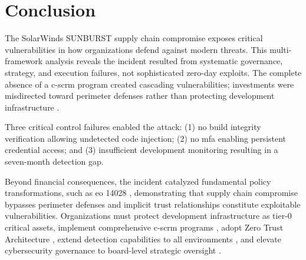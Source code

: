\section{Conclusion}
\label{sec:conclusion}

The SolarWinds SUNBURST supply chain compromise exposes critical vulnerabilities in how organizations defend against modern threats. This multi-framework analysis reveals the incident resulted from systematic governance, strategy, and execution failures, not sophisticated zero-day exploits. The complete absence of a \gls{c-scrm} program created cascading vulnerabilities; investments were misdirected toward perimeter defenses rather than protecting development infrastructure \cite{nagle_solarwinds_2023}.

Three critical control failures enabled the attack: (1) no build integrity verification allowing undetected code injection; (2) no \gls{mfa} enabling persistent credential access; and (3) insufficient development monitoring resulting in a seven-month detection gap.

Beyond financial consequences, the incident catalyzed fundamental policy transformations, such as \gls{eo} 14028 \cite{us_eo_2021}, demonstrating that supply chain compromise bypasses perimeter defenses and implicit trust relationships constitute exploitable vulnerabilities. Organizations must protect development infrastructure as tier-0 critical assets, implement comprehensive \gls{c-scrm} programs \cite{boyens_cybersecurity_2022}, adopt Zero Trust Architecture \cite{rose_zero_2020}, extend detection capabilities to all environments \cite{nelson_incident_2025}, and elevate cybersecurity governance to board-level strategic oversight \cite{pascoe_nist_2024}.
